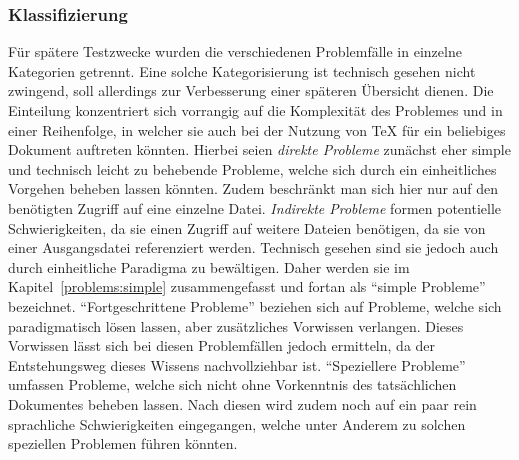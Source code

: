 \subsubsection{Klassifizierung}
Für spätere Testzwecke wurden die verschiedenen Problemfälle in einzelne Kategorien getrennt. Eine solche Kategorisierung ist technisch gesehen nicht zwingend, soll allerdings zur Verbesserung einer späteren Übersicht dienen. Die Einteilung konzentriert sich vorrangig auf die Komplexität des Problemes und in einer Reihenfolge, in welcher sie auch bei der Nutzung von \TeX{} für ein beliebiges Dokument auftreten könnten. 
%
Hierbei seien \textit{direkte Probleme} zunächst eher simple und technisch leicht zu behebende Probleme, welche sich durch ein einheitliches Vorgehen beheben lassen könnten.%
Zudem beschränkt man sich hier nur auf den benötigten Zugriff auf eine einzelne Datei.
%
\textit{Indirekte Probleme} formen potentielle Schwierigkeiten, da sie einen Zugriff auf weitere Dateien benötigen, da sie von einer Ausgangsdatei referenziert werden. Technisch gesehen sind sie jedoch auch durch einheitliche Paradigma zu bewältigen. Daher werden sie im Kapitel~\ref{problems:simple} zusammengefasst und fortan als \enquote{simple Probleme} bezeichnet.
%
\enquote{Fortgeschrittene Probleme} beziehen sich auf Probleme, welche sich paradigmatisch lösen lassen, %
aber zusätzliches Vorwissen verlangen. Dieses Vorwissen lässt sich bei diesen Problemfällen jedoch ermitteln, da der Entstehungsweg dieses Wissens nachvollziehbar ist.%
\enquote{Speziellere Probleme} umfassen Probleme, welche sich nicht ohne Vorkenntnis des tatsächlichen Dokumentes beheben lassen. Nach diesen wird zudem noch auf ein paar rein sprachliche Schwierigkeiten eingegangen, welche unter Anderem zu solchen speziellen Problemen führen könnten.

